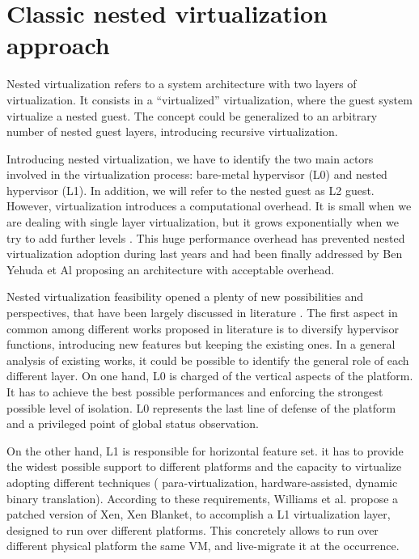 \documentclass{acm_proc_article-sp} %
\begin{document}
\section{Classic nested virtualization approach}

Nested virtualization refers to a system architecture with two layers of virtualization. It consists in a ``virtualized'' virtualization, where the guest system virtualize a nested guest. The concept could be generalized to an arbitrary number of nested guest layers, introducing recursive virtualization.

Introducing nested virtualization, we have to identify the two main actors involved in the virtualization process: bare-metal hypervisor (L0) and nested hypervisor (L1). In addition, we will refer to the nested guest as L2 guest. 
However, virtualization introduces a computational overhead. It is small when we are dealing with single layer virtualization, but it grows exponentially when we try to add further levels \cite{rec:virt}. This huge performance overhead has prevented nested virtualization adoption during last years and had been finally addressed by Ben Yehuda et Al \cite{turtles:ibm} proposing an architecture with acceptable overhead.

Nested virtualization feasibility opened a plenty of new possibilities and perspectives, that have been largely discussed in literature \cite{rec:virt,turtles:ibm,art:blan}. The first aspect in common among different works proposed in literature is to diversify hypervisor functions, introducing new features but keeping the existing ones. In a general analysis of existing works, it could be possible to identify the general role of each different layer.
On one hand, L0 is charged of the vertical aspects of the platform. It has to achieve  the best possible performances and enforcing the strongest possible level of isolation. L0 represents the last line of defense of the platform and a privileged point of global status observation.

On the other hand, L1 is responsible for horizontal feature set. it has to provide the widest possible support to different platforms and the capacity to virtualize adopting different techniques ( para-virtualization, hardware-assisted, dynamic binary translation). According to these requirements, Williams et al. \cite{art:blan} propose a patched version of Xen, Xen Blanket, to accomplish a L1 virtualization layer, designed to run over different platforms. This concretely allows to run over different physical platform the same VM, and live-migrate it at the occurrence.
\end{document}
